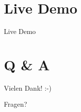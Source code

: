 \documentclass[aspectratio=169]{beamer}
\begin{document}
\section{Live Demo}
\begin{frame}
    \centering\huge Live Demo
\end{frame}

\section{Q \& A}
\begin{frame}
    \centering\huge Vielen Dank! :-)
\end{frame}

\begin{frame}
    \centering\huge Fragen?
\end{frame}
\end{document}

